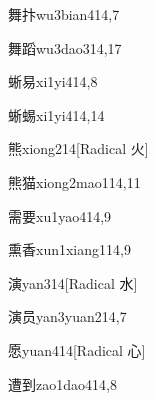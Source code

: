\begin{verbete}{舞抃}{wu3bian4}{14,7}
\end{verbete}

\begin{verbete}{舞蹈}{wu3dao3}{14,17}
\end{verbete}

\begin{verbete}{蜥易}{xi1yi4}{14,8}
\end{verbete}

\begin{verbete}{蜥蜴}{xi1yi4}{14,14}
\end{verbete}

\begin{verbete}{熊}{xiong2}{14}[Radical 火]
\end{verbete}

\begin{verbete}{熊猫}{xiong2mao1}{14,11}
\end{verbete}

\begin{verbete}{需要}{xu1yao4}{14,9}
\end{verbete}

\begin{verbete}{熏香}{xun1xiang1}{14,9}
\end{verbete}

\begin{verbete}{演}{yan3}{14}[Radical 水]
\end{verbete}

\begin{verbete}{演员}{yan3yuan2}{14,7}
\end{verbete}

\begin{verbete}{愿}{yuan4}{14}[Radical 心]
\end{verbete}

\begin{verbete}{遭到}{zao1dao4}{14,8}
\end{verbete}

